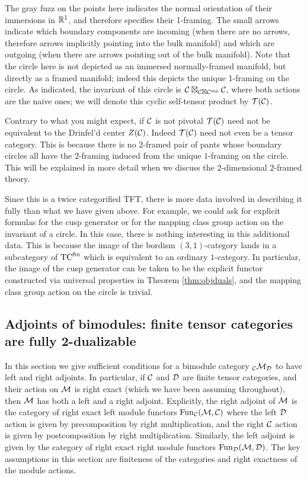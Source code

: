 \documentclass{amsart}
\begin{document}
\nid The gray fuzz on the points here indicates the normal orientation of their immersions in $\mathbb R^1$, and therefore specifies their 1-framing.  The small arrows indicate which boundary components are incoming (when there are no arrows, therefore arrows implicitly pointing into the bulk manifold) and which are outgoing (when there are arrows pointing out of the bulk manifold).  Note that the circle here is not depicted as an immersed normally-framed manifold, but directly as a framed manifold; indeed this depicts the unique 1-framing on the circle.  As indicated, the invariant of this circle is $\mathcal C \boxtimes_{\mathcal C \boxtimes \mathcal C^{\mathrm{mp}}} \mathcal C$, where both actions are the naive ones; we will denote this cyclic self-tensor product by $\mathcal T(\mathcal C)$.

\begin{warning}
Contrary to what you might expect,  if $\mathcal C$ is not pivotal $\mathcal T(\mathcal C)$ need not be equivalent to the Drinfel'd center $Z(\mathcal C)$.  Indeed $\mathcal T(\mathcal C)$ need not even be a tensor category.  This is because there is no $2$-framed pair of pants whose boundary circles all have the $2$-framing induced from the unique $1$-framing on the circle.  This will be explained in more detail when we discuss the $2$-dimensional $2$-framed theory.
\end{warning}

\begin{remark}
Since this is a twice categorified TFT, there is more data involved in describing it fully than what we have given above.  For example, we could ask for explicit formulas for the cusp generator or for the mapping class group action on the invariant of a circle.  In this case, there is nothing interesting in this additional data.  This is because the image of the bordism $(3,1)$-category lands in a subcategory of ${\mathrm{TC}^{\text{fin}}}$ which is equivalent to an ordinary $1$-category.  In particular, the image of the cusp generator can be taken to be the explicit functor constructed via universal properties in Theorem \ref{thm:objduals}, and the mapping class group action on the circle is trivial.
\end{remark}

\subsection{Adjoints of bimodules: finite tensor categories are fully 2-dualizable}  \label{sec-df-modules}

In this section we give sufficient conditions for a  bimodule category ${}_\mathcal C \mathcal M_\mathcal D$ to have left and right adjoints.  In particular, if $\mathcal C$ and $\mathcal D$ are finite tensor categories, and their action on $\mathcal M$ is right exact (which we have been assuming throughout), then $\mathcal M$ has both a left and a right adjoint.  Explicitly, the right adjoint of $\mathcal M$ is the category of right exact left module functors 
$\operatorname{Fun}_{{\mathcal C}}(\mathcal M, \mathcal C)$
 where the left $\mathcal D$ action is given by precomposition by right multiplication, and the right $\mathcal C$ action is given by postcomposition by right multiplication.  Similarly, the left adjoint is given by the category of right exact right module functors $\operatorname{Fun}_{\mathcal D}(\mathcal M, \mathcal D)$.  The key assumptions in this section are finiteness of the categories and right exactness of the module actions.
\end{document}
